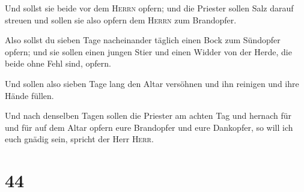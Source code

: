  Und sollst sie beide vor dem \textsc{Herrn} opfern; und
die Priester sollen Salz darauf streuen und sollen sie also opfern dem
\textsc{Herrn} zum Brandopfer.

 Also sollst du sieben Tage nacheinander täglich einen
Bock zum Sündopfer opfern; und sie sollen einen jungen Stier und einen
Widder von der Herde, die beide ohne Fehl sind, opfern.

 Und sollen also sieben Tage lang den Altar versöhnen und
ihn reinigen und ihre Hände füllen.

 Und nach denselben Tagen sollen die Priester am achten
Tag und hernach für und für auf dem Altar opfern eure Brandopfer und
eure Dankopfer, so will ich euch gnädig sein, spricht der Herr
\textsc{Herr}.

\hypertarget{section-43}{%
\section{44}\label{section-43}}

